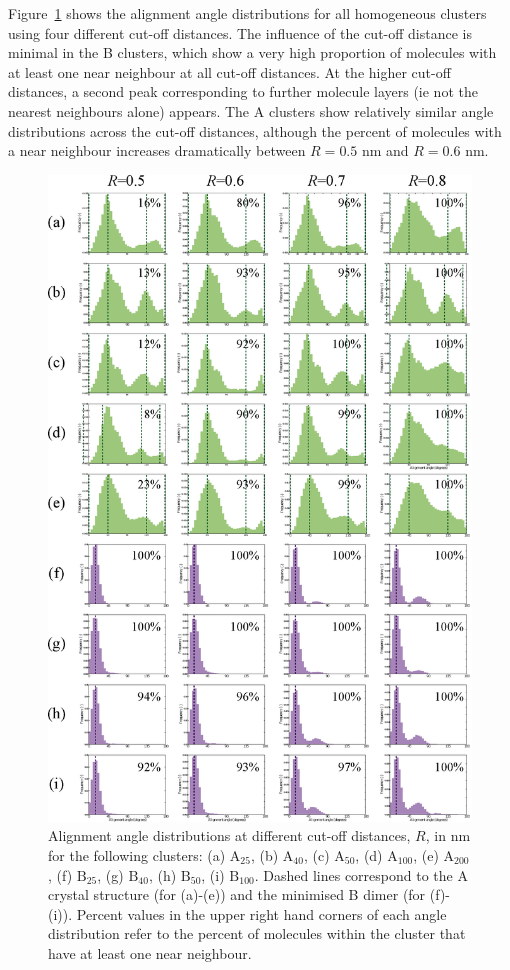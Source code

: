 Figure~\ref{figSI:alignmentangles_cutoffs} shows the alignment angle distributions for all homogeneous clusters using four different cut-off distances.  The influence of the cut-off distance is minimal in the B clusters, which show a very high proportion of molecules with at least one near neighbour at all cut-off distances.  At the higher cut-off distances, a second peak corresponding to further molecule layers (ie not the nearest neighbours alone) appears.  The A clusters show relatively similar angle distributions across the cut-off distances, although the percent of molecules with a near neighbour increases dramatically between $R=0.5$ nm and $R=0.6$ nm.  
%
\begin{figure}[!tbh]
\centering
\includegraphics[width=0.85\linewidth]{Figures/AlignmentAnglesCutoffAssessment_SI.eps}
\caption{Alignment angle distributions at different cut-off distances, $R$, in nm for the following clusters: (a) $\text{A}_{\text{25}}$, (b) $\text{A}_{\text{40}}$, (c) $\text{A}_{\text{50}}$, (d) $\text{A}_{\text{100}}$, (e) $\text{A}_{\text{200}}$, (f) $\text{B}_{\text{25}}$, (g) $\text{B}_{\text{40}}$, (h) $\text{B}_{\text{50}}$, (i) $\text{B}_{\text{100}}$. Dashed lines correspond to the A crystal structure (for (a)-(e)) and the minimised B dimer (for (f)-(i)). Percent values in the upper right hand corners of each angle distribution refer to the percent of molecules within the cluster that have at least one near neighbour.}
\label{figSI:alignmentangles_cutoffs}
\end{figure}
%

